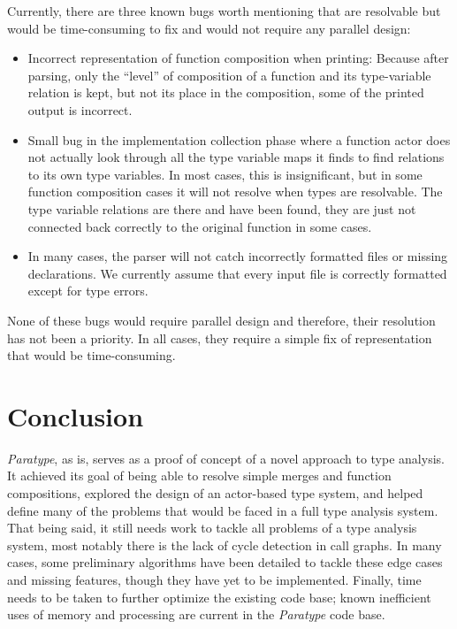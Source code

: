 \documentclass{acm_proc_article-sp}
\begin{document}
Currently, there are three known bugs worth mentioning that are resolvable but
would be time-consuming to fix and would not require any parallel design:
\begin{itemize}
	\item Incorrect representation of function composition when printing:
		Because after parsing, only the ``level'' of composition of a function
		and its type-variable relation is kept, but not its place in the
		composition, some of the printed output is incorrect. 
	\item Small bug in the implementation collection phase where a function
		actor does not actually look through all the type variable maps it
		finds to find relations to its own type variables. In most cases, this
		is insignificant, but in some function composition cases it will not
		resolve when types are resolvable. The type variable relations are
		there and have been found, they are just not connected back correctly
		to the original function in some cases.
	\item In many cases, the parser will not catch incorrectly formatted files
		or missing declarations. We currently assume that every input file is
		correctly formatted except for type errors.
\end{itemize}

None of these bugs would require parallel design and therefore, their
resolution has not been a priority. In all cases, they require a
simple fix of representation that would be time-consuming.

\section{Conclusion}

\emph{Paratype}, as is, serves as a proof of concept of a novel approach to
type analysis. It achieved its goal of being able to resolve simple merges and
function compositions, explored the design of an actor-based type system, and
helped define many of the problems that would be faced in a full type analysis
system. That being said, it still needs work to tackle all problems of a type
analysis system, most notably there is the lack of cycle detection in call
graphs. In many cases, some preliminary algorithms have been detailed to tackle
these edge cases and missing features, though they have yet to be implemented.
Finally, time needs to be taken to further optimize the existing code base;
known inefficient uses of memory and processing are current in the
\emph{Paratype} code base.
\end{document}

